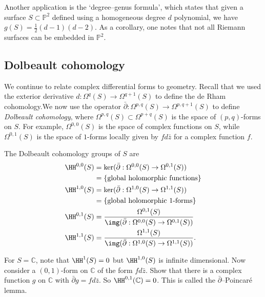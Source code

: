 \begin{exercise}
    Another application is the `degree--genus formula', which states that given
    a surface \(S\subset \mathbb{P}^2\) defined using a homogeneous degree \(d\)
    polynomial, we have \(g(S)=\frac{1}{2}(d-1)(d-2)\). As a corollary, one
    notes that not all Riemann surfaces can be embedded in \(\mathbb{P}^2\).
\end{exercise}

\subsection{Dolbeault cohomology} We continue to relate complex differential
forms to geometry. Recall that we used the exterior derivative
\(d:\Omega^q(S)\to \Omega^{q+1}(S)\) to define the de Rham cohomology.We now use
the operator \(\bar\partial:\Omega^{p,q}(S)\to \Omega^{p,q+1}(S)\) to define
\textit{Dolbeault cohomology}, where \(\Omega^{p,q}(S)\subset \Omega^{p+q}(S)\)
is the space of \((p,q)\)-forms on \(S\). For example, \(\Omega^{0,0}(S)\) is
the space of complex functions on \(S\), while \(\Omega^{0,1}(S)\) is the space
of \(1\)-forms locally given by \(fd\bar z\) for a complex function \(f\).

\begin{definition}
    The Dolbeault cohomology groups of \(S\) are
    \begin{align*}
        \HH^{0,0}(S)&=\ker(\bar\partial : \Omega^{0,0}(S)\to \Omega^{0,1}(S))\\
        &=\{\text{global holomorphic functions}\}\\
        \HH^{1,0}(S)&=\ker(\bar\partial : \Omega^{1,0}(S)\to \Omega^{1,1}(S))\\
        &=\{\text{global holomorphic \(1\)-forms}\}\\
        \HH^{0,1}(S)&=\frac{\Omega^{0,1}(S)}{\img(\bar\partial:\Omega^{0,0}(S)\to
        \Omega^{0,1}(S))}\\
        \HH^{1,1}(S)&=\frac{\Omega^{1,1}(S)}{\img(\bar\partial:\Omega^{1,0}(S)\to
        \Omega^{1,1}(S))}.
    \end{align*}
\end{definition}

\begin{exercise}
    For \(S= \mathbb{C}\), note that \(\HH^1(S)=0\) but
    \(\HH^{1,0}(S)\) is infinite dimensional. Now consider a \((0,1)\)-form on
    \(\mathbb{C}\) of the form \(fd\bar z\). Show that there is a complex
    function \(g\) on \(\mathbb{C}\) with \(\bar\partial g = fd\bar z\). So
    \(\HH^{0,1}(\mathbb{C})=0\). This is called the \(\bar\partial\)--Poincar\'e
    lemma.
\end{exercise}

